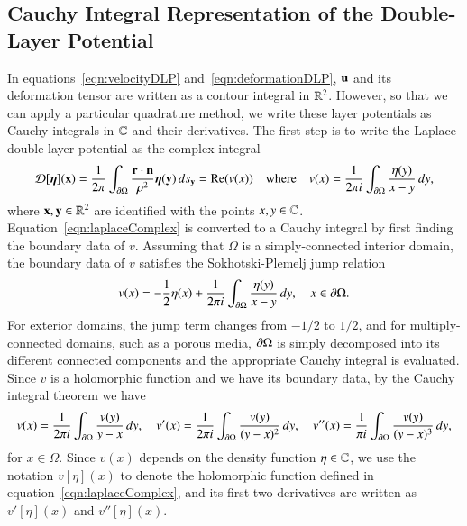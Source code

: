 \documentclass[preprint,10pt]{elsarticle}
\begin{document}
\subsection{Cauchy Integral Representation of the Double-Layer
Potential}
\label{sec:DLPcomplex}
In equations~\eqref{eqn:velocityDLP} and~\eqref{eqn:deformationDLP},
${\mathbf{u}}$ and its deformation tensor are written as a contour integral in
${\mathbb{R}}^2$.  However, so that we can apply a particular quadrature method,
we write these layer potentials as Cauchy integrals in
${\mathbb{C}}$ and their derivatives.  The first step is to write the Laplace
double-layer potential as the complex integral
\begin{align}
  {\mathcal{D}}[{\boldsymbol\eta}]({\mathbf{x}}) = \frac{1}{2\pi} \int_{{\partial}\Omega} 
    \frac{{\mathbf{r}} \cdot {\mathbf{n}}}{\rho^2}{\boldsymbol\eta}({\mathbf{y}})\, ds_{\mathbf{y}} = {\operatorname{Re}} (v(x)) \quad 
    \text{where} \quad v(x) = \frac{1}{2\pi i} \int_{{\partial}\Omega}
    \frac{\eta(y)}{x - y} \, dy,
  \label{eqn:laplaceComplex}
\end{align}
where ${\mathbf{x}},{\mathbf{y}} \in {\mathbb{R}}^2$ are identified with the points $x,y \in {\mathbb{C}}$.
Equation~\eqref{eqn:laplaceComplex} is converted to a Cauchy
integral by first finding the boundary data of $v$.  Assuming that
$\Omega$ is a simply-connected interior domain, the boundary data
of $v$ satisfies the Sokhotski-Plemelj jump relation
\begin{align}
  \label{eqn:SPrelation}
  v(x) = - \frac{1}{2} \eta(x) + \frac{1}{2\pi i} \int_{{\partial}\Omega}
    \frac{\eta(y)}{x-y}\, dy, \quad x \in {\partial}\Omega.
\end{align}
For exterior domains, the jump term changes from $-1/2$ to $1/2$, and
for multiply-connected domains, such as a porous media, ${\partial}\Omega$ is
simply decomposed into its different connected components and the
appropriate Cauchy integral is evaluated.  Since $v$ is a holomorphic
function and we have its boundary data, by the Cauchy integral theorem
we have
\begin{align}
  \label{eqn:cauchy}
  v(x) = \frac{1}{2\pi i}\int_{{\partial}\Omega} 
    \frac{v(y)}{y-x} \,dy, \quad
  v'(x) = \frac{1}{2\pi i} \int_{{\partial}\Omega}
    \frac{v(y)}{(y-x)^2} \, dy, \quad
  v''(x) = \frac{1}{\pi i} \int_{{\partial}\Omega}
    \frac{v(y)}{(y-x)^3} \, dy,
\end{align}
for $x \in \Omega$.  Since $v(x)$ depends on the density function $\eta
\in {\mathbb{C}}$, we use the notation $v[\eta](x)$ to denote the holomorphic
function defined in equation~\eqref{eqn:laplaceComplex}, and its first
two derivatives are written as $v'[\eta](x)$ and $v''[\eta](x)$.  
  
\end{document}
